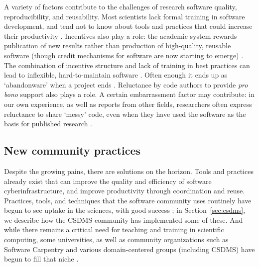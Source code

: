 \documentclass{article} %
\begin{document}
A variety of factors contribute to the challenges of research software quality, reproducibility, and reusability. Most scientists lack formal training in software development, and tend not to know about tools and practices that could increase their productivity \citep{kelly2007software,basili2008understanding,faulk2009scientific,hannay2009scientists,hwang2017software,alnoamany2018towards,pinto2018scientists,kellogg2018role}.  Incentives also play a role: the academic system rewards publication of new results rather than production of high-quality, reusable software (though credit mechanisms for software are now starting to emerge) \citep{leveque2009python,howison2011scientific,morin2012shining,turk2013scaling,ahalt2014water,poisot2015best,hwang2017software,wiese2019naming}. The combination of incentive structure and lack of training in best practices can lead to inflexible, hard-to-maintain software \citep{brown2014run,johanson2018software}. Often enough it ends up as `abandonware' when a project ends \citep{barnes2010publish}. Reluctance by code authors to provide \textit{pro bono} support also plays a role. A certain embarrassment factor may contribute: in our own experience, as well as reports from other fields, researchers often express reluctance to share `messy' code, even when they have used the software as the basis for published research \citep{barnes2010publish,morin2012shining,leveque2013top}.



\subsection{New community practices}

Despite the growing pains, there are solutions on the horizon. Tools and practices already exist that can improve the quality and efficiency of software cyberinfrastructure, and improve productivity through coordination and reuse. Practices, tools, and techniques that the software community uses routinely have begun to see uptake in the sciences, with good success \citep{bangerth2013makes,turk2013scaling,hastings2014ten,wilson2014best,brown2014run,poisot2015best,hwang2017software,nanthaamornphong2017test,scott2017esip,taschuk2017ten,wilson2017good,benureau2018re,bryan2018excuse,adorf2018professionally,lathrop2019introduction}; in Section~\ref{sec:csdms}, we describe how the CSDMS community has implemented some of these. And while there remains a critical need for teaching and training in scientific computing, some universities, as well as community organizations such as Software Carpentry and various domain-centered groups (including CSDMS) have begun to fill that niche \citep[e.g.,][]{jacobs2016experiences}. 
\end{document}
